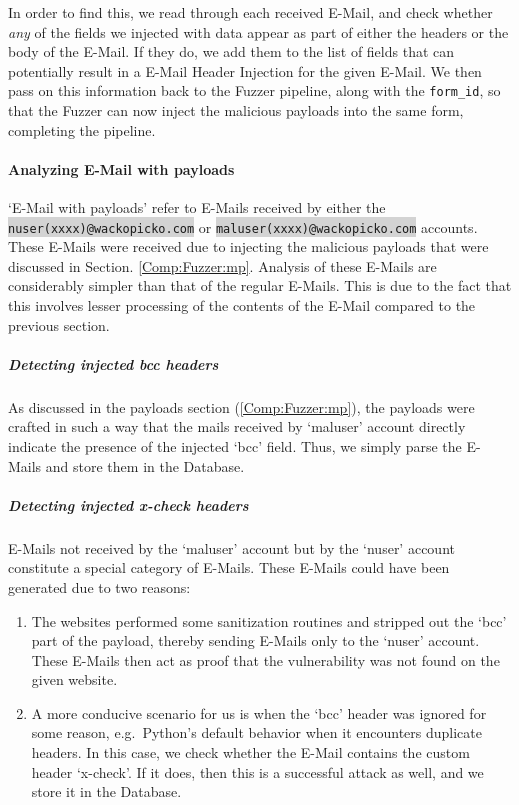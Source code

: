 	In order to find this, we read through each received E-Mail, and check whether \emph{any} of the fields we injected with data appear as part of either the headers or the body of the E-Mail. If they do, we add them to the list of fields that can potentially result in a E-Mail Header Injection for the given E-Mail. We then pass on this information back to the Fuzzer pipeline, along with the \lstinline{form_id}, so that the Fuzzer can now inject the malicious payloads into the same form, completing the pipeline.
	
	\paragraph{Analyzing E-Mail with payloads}
	`E-Mail with payloads' refer to E-Mails received by either the \colorbox{lightgray}{\lstinline{nuser(xxxx)@wackopicko.com}} or \colorbox{lightgray}{\lstinline{maluser(xxxx)@wackopicko.com}} accounts. These E-Mails were received due to injecting the malicious payloads that were discussed in Section. \ref{Comp:Fuzzer:mp}. Analysis of these E-Mails are considerably simpler than that of the regular E-Mails. This is due to the fact that this involves lesser processing of the contents of the E-Mail compared to the previous section.
		\subparagraph{Detecting injected bcc headers}
		As discussed in the payloads section (\ref{Comp:Fuzzer:mp}), the payloads were crafted in such a way that the mails received by `maluser' account directly indicate the presence of the injected `bcc' field. Thus, we simply parse the E-Mails and store them in the Database.
		
		\subparagraph{Detecting injected x-check headers}
		E-Mails not received by the `maluser' account but by the `nuser' account constitute a special category of E-Mails.
		These E-Mails could have been generated due to two reasons:
		\begin{enumerate}
			\item The websites performed some sanitization routines and stripped out the `bcc' part of the payload, thereby sending E-Mails only to the `nuser' account. These E-Mails then act as proof that the vulnerability was not found on the given website.
			\item A more conducive scenario for us is when the `bcc' header was ignored for some reason, e.g.\ Python's default behavior when it encounters duplicate headers. In this case, we check whether the E-Mail contains the custom header `x-check'. If it does, then this is a successful attack as well, and we store it in the Database.
		\end{enumerate}
